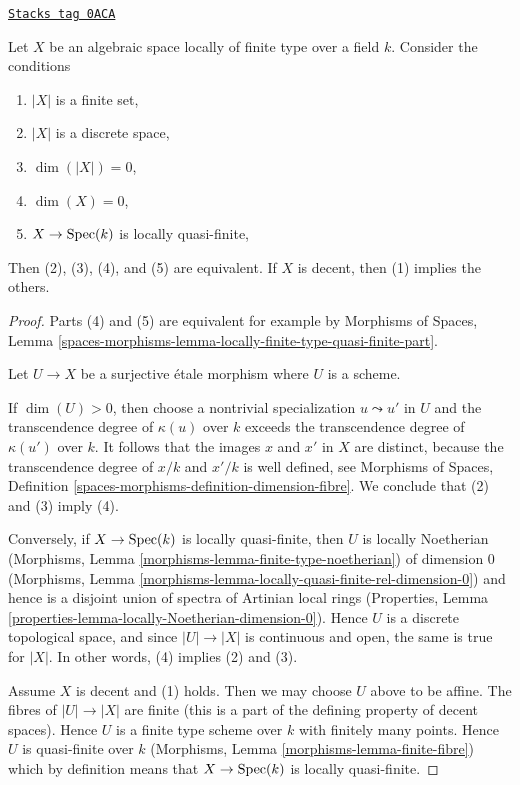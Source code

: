 \begin{lemma}
\label{decent-spaces-lemma-conditions-on-space-over-field}
\href{https://stacks.math.columbia.edu/tag/0ACA}{\texttt{Stacks tag 0ACA}}

Let $X$ be an algebraic space locally of finite type over a field $k$.
Consider the conditions
\begin{enumerate}
\item $|X|$ is a finite set,
\item $|X|$ is a discrete space,
\item $\dim(|X|) = 0$,
\item $\dim(X) = 0$,
\item $X \to \operatorname{Spec}(k)$ is locally quasi-finite,
\end{enumerate}
Then (2), (3), (4), and (5) are equivalent.
If $X$ is decent, then (1) implies the others.
\end{lemma}

\begin{proof}
Parts (4) and (5) are equivalent for example by
Morphisms of Spaces, Lemma
\ref{spaces-morphisms-lemma-locally-finite-type-quasi-finite-part}.

\medskip\noindent
Let $U \to X$ be a surjective \'etale morphism where $U$ is a scheme.

\medskip\noindent
If $\dim(U) > 0$, then choose a nontrivial specialization
$u \leadsto u'$ in $U$ and the transcendence degree of $\kappa(u)$
over $k$ exceeds the transcendence degree of $\kappa(u')$ over $k$.
It follows that the images $x$ and $x'$ in $X$ are distinct, because
the transcendence degree of $x/k$ and $x'/k$ is well defined, see
Morphisms of Spaces, Definition
\ref{spaces-morphisms-definition-dimension-fibre}.
We conclude that (2) and (3) imply (4).

\medskip\noindent
Conversely, if $X \to \operatorname{Spec}(k)$ is locally quasi-finite, then $U$ is
locally Noetherian
(Morphisms, Lemma \ref{morphisms-lemma-finite-type-noetherian})
of dimension $0$
(Morphisms, Lemma \ref{morphisms-lemma-locally-quasi-finite-rel-dimension-0})
and hence is a disjoint union of spectra of Artinian local rings
(Properties, Lemma \ref{properties-lemma-locally-Noetherian-dimension-0}).
Hence $U$ is a discrete topological space, and since $|U| \to |X|$
is continuous and open, the same is true for $|X|$.
In other words, (4) implies (2) and (3).

\medskip\noindent
Assume $X$ is decent and (1) holds. Then we may choose $U$ above to
be affine. The fibres of $|U| \to |X|$ are finite (this is a part of the
defining property of decent spaces). Hence $U$ is a finite type scheme
over $k$ with finitely many points. Hence $U$ is quasi-finite over $k$
(Morphisms, Lemma \ref{morphisms-lemma-finite-fibre})
which by definition means that $X \to \operatorname{Spec}(k)$ is locally quasi-finite.
\end{proof}


